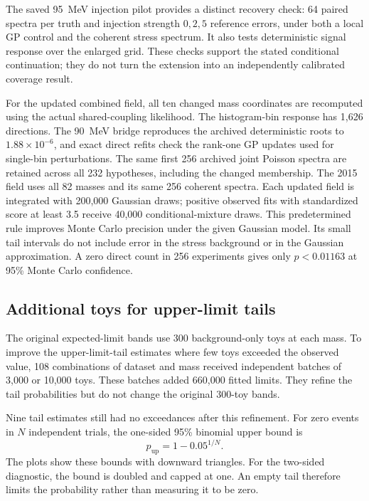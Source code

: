 The saved 95~MeV injection pilot provides a distinct recovery check: 64
paired spectra per truth and injection strength $0,2,5$ reference errors,
under both a local GP control and the coherent stress spectrum. It also
tests deterministic signal response over the enlarged grid. These checks
support the stated conditional continuation; they do not turn the extension
into an independently calibrated coverage result.

For the updated combined field, all ten changed mass coordinates are
recomputed using the actual shared-coupling likelihood. The histogram-bin
response has 1,626 directions. The 90~MeV bridge reproduces the archived
deterministic roots to $1.88\times10^{-6}$, and exact direct refits check
the rank-one GP updates used for single-bin perturbations. The same first
256 archived joint Poisson spectra are retained across all 232 hypotheses,
including the changed membership. The 2015 field uses all 82 masses and
its same 256 coherent spectra. Each updated field is integrated with
200,000 Gaussian draws; positive observed fits with standardized score
at least 3.5 receive 40,000 conditional-mixture draws. This predetermined
rule improves Monte Carlo precision under the given Gaussian model. Its
small tail intervals do not include error in the stress background or in
the Gaussian approximation. A zero direct count in 256 experiments gives
only $p<0.01163$ at 95\% Monte Carlo confidence.

\subsection{Additional toys for upper-limit tails}
\label{app:v505-tail-sampling}
The original expected-limit bands use 300 background-only toys at each mass.
To improve the upper-limit-tail estimates where few toys exceeded the observed
value, 108 combinations of dataset and mass received independent batches of
3,000 or 10,000 toys. These batches added 660,000 fitted limits. They refine
the tail probabilities but do not change the original 300-toy bands.

Nine tail estimates still had no exceedances after this refinement. For
zero events in $N$ independent trials, the one-sided 95\% binomial upper
bound is
\begin{equation}
 p_{\mathrm{up}}=1-0.05^{1/N}.
\end{equation}
The plots show these bounds with downward triangles. For the two-sided
diagnostic, the bound is doubled and capped at one. An empty tail therefore
limits the probability rather than measuring it to be zero.

